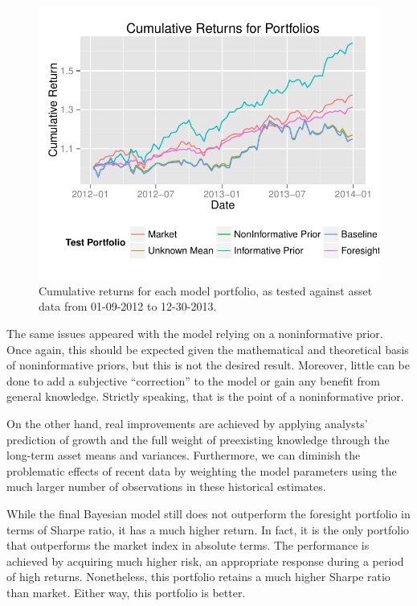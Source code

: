 \documentclass[a4paper]{article}\usepackage[]{graphicx}\usepackage[]{color}
\makeatletter
\def\maxwidth{ %
  \ifdim\Gin@nat@width>\linewidth
    \linewidth
  \else
    \Gin@nat@width
  \fi
}
\newenvironment{knitrout}{}{} %
\makeatother
\begin{document}
\begin{figure}[t]
    \centering
\begin{knitrout}
\color{fgcolor}
\includegraphics[width=\maxwidth]{figure/results-1} 

\end{knitrout}
    \caption{Cumulative returns for each model portfolio, as tested against asset data from 01-09-2012 to 12-30-2013.}
    \label{fig:cumret}
\end{figure}

The same issues appeared with the model relying on a noninformative prior. Once again, this should be expected given the mathematical and theoretical basis of noninformative priors, but this is not the desired result. Moreover, little can be done to add a subjective ``correction'' to the model or gain any benefit from general knowledge. Strictly speaking, that is the point of a noninformative prior. 

On the other hand, real improvements are achieved by applying analysts' prediction of growth and the full weight of preexisting knowledge through the long-term asset means and variances. Furthermore, we can diminish the problematic effects of recent data by weighting the model parameters using the much larger number of observations in these historical estimates.

While the final Bayesian model still does not outperform the foresight portfolio in terms of Sharpe ratio, it has a much higher return. In fact, it is the only portfolio that outperforms the market index in absolute terms. The performance is achieved by acquiring much higher risk, an appropriate response during a period of high returns. Nonetheless, this portfolio retains a much higher Sharpe ratio than market. Either way, this portfolio is better.
\end{document}
